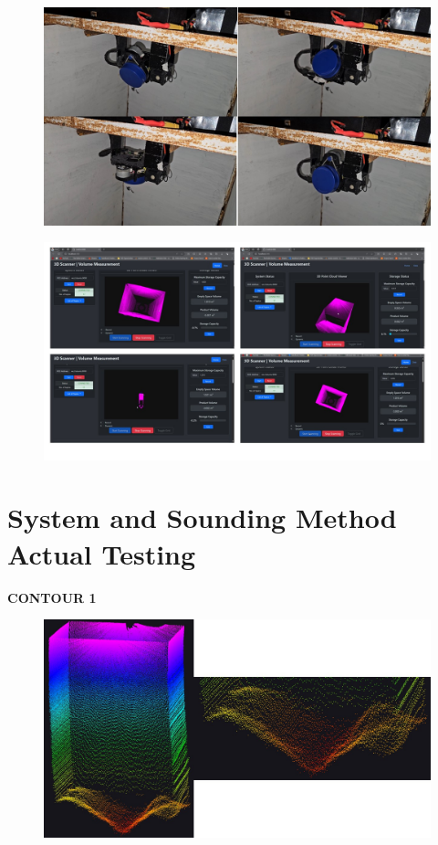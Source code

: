 \begin{figure}[H]
	\centering
	\includegraphics[width=1\textwidth]{Figures/Appendecis/testing/Slide12}
\end{figure}

\begin{figure}[H]
	\centering
	\includegraphics[width=1\textwidth]{Figures/Appendecis/testing/Slide11}
\end{figure}

\newpage

\section*{System and Sounding Method Actual Testing}

\textbf{CONTOUR 1}

\begin{figure}[H]
	\centering
	\includegraphics[width=1\textwidth]{Figures/test3-1}
\end{figure}

